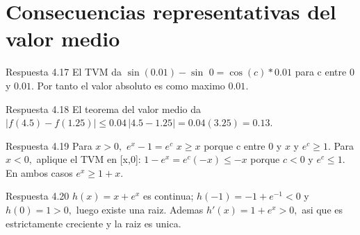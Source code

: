 \documentclass[10pt,a4paper,oneside,openany]{book}
\begin{document}
\section{Consecuencias representativas del valor medio}
\begin{PSevenAnswerFixed}{Respuesta 4.17}
El TVM da \(\sin(0.01)-\sin\) \(0=\cos(c)*0.01\) para c entre \(0\) y \(0.01\). Por tanto el valor absoluto es como maximo \(0.01\).
\end{PSevenAnswerFixed}
\begin{PSevenAnswerFixed}{Respuesta 4.18}
El teorema del valor medio da \(|f(4.5)-f(1.25)|\le0.04\,|4.5-1.25|=0.04(3.25)=0.13\).
\end{PSevenAnswerFixed}
\begin{PSevenAnswerFixed}{Respuesta 4.19}
Para \(x>0,\) \(e^x-1=e^c\) \(x\ge x\) porque c entre \(0\) y \(x\) y \(e^c\ge 1\). Para \(x<0,\) aplique el TVM en [x,0]: \(1-e^x=e^c(-x)\le -x\) porque \(c<0\) y \(e^c\le 1\). En ambos casos \(e^x\ge 1+x\).
\end{PSevenAnswerFixed}
\begin{PSevenAnswerFixed}{Respuesta 4.20}
\(h(x)=x+e^x\) es continua; \(h(-1)=-1+e^{-1}<0\) y \(h(0)=1>0,\) luego existe una raiz. Ademas \(h'(x)=1+e^x>0,\) asi que es estrictamente creciente y la raiz es unica.
\end{PSevenAnswerFixed}
\end{document}
